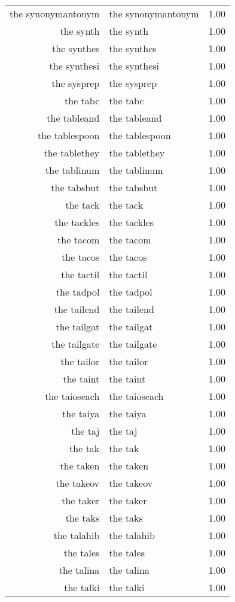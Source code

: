 \begin{table}[ht]
\begin{tabular}{rlr}
  the synonymantonym & the synonymantonym & 1.00 \\ 
  the synth & the synth & 1.00 \\ 
  the synthes & the synthes & 1.00 \\ 
  the synthesi & the synthesi & 1.00 \\ 
  the sysprep & the sysprep & 1.00 \\ 
  the tabc & the tabc & 1.00 \\ 
  the tableand & the tableand & 1.00 \\ 
  the tablespoon & the tablespoon & 1.00 \\ 
  the tablethey & the tablethey & 1.00 \\ 
  the tablinum & the tablinum & 1.00 \\ 
  the tabsbut & the tabsbut & 1.00 \\ 
  the tack & the tack & 1.00 \\ 
  the tackles & the tackles & 1.00 \\ 
  the tacom & the tacom & 1.00 \\ 
  the tacos & the tacos & 1.00 \\ 
  the tactil & the tactil & 1.00 \\ 
  the tadpol & the tadpol & 1.00 \\ 
  the tailend & the tailend & 1.00 \\ 
  the tailgat & the tailgat & 1.00 \\ 
  the tailgate & the tailgate & 1.00 \\ 
  the tailor & the tailor & 1.00 \\ 
  the taint & the taint & 1.00 \\ 
  the taioseach & the taioseach & 1.00 \\ 
  the taiya & the taiya & 1.00 \\ 
  the taj & the taj & 1.00 \\ 
  the tak & the tak & 1.00 \\ 
  the taken & the taken & 1.00 \\ 
  the takeov & the takeov & 1.00 \\ 
  the taker & the taker & 1.00 \\ 
  the taks & the taks & 1.00 \\ 
  the talahib & the talahib & 1.00 \\ 
  the tales & the tales & 1.00 \\ 
  the talina & the talina & 1.00 \\ 
  the talki & the talki & 1.00 \\ 

\end{tabular}
\end{table}
